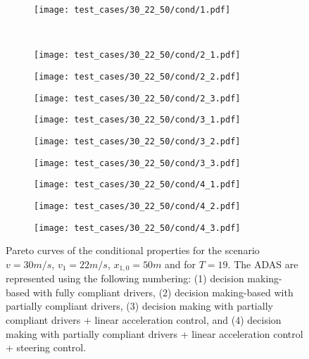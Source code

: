 \begin{figure}[H]
\vspace{3em}
\centering
\begin{subfigure}{0.32\textwidth}
  \centering
  \texttt{[image: test\_cases/30\_22\_50/cond/1.pdf]}
\end{subfigure}\\
\begin{subfigure}{0.32\textwidth}
  \centering
  \texttt{[image: test\_cases/30\_22\_50/cond/2\_1.pdf]}
\end{subfigure} 
\begin{subfigure}{0.32\textwidth}
  \centering
  \texttt{[image: test\_cases/30\_22\_50/cond/2\_2.pdf]}
\end{subfigure}
\begin{subfigure}{0.32\textwidth}
  \centering
  \texttt{[image: test\_cases/30\_22\_50/cond/2\_3.pdf]}
\end{subfigure}
\begin{subfigure}{0.32\textwidth}
  \centering
  \texttt{[image: test\_cases/30\_22\_50/cond/3\_1.pdf]}
\end{subfigure}
\begin{subfigure}{0.32\textwidth}
  \centering
  \texttt{[image: test\_cases/30\_22\_50/cond/3\_2.pdf]}
\end{subfigure}
\begin{subfigure}{0.32\textwidth}
  \centering
  \texttt{[image: test\_cases/30\_22\_50/cond/3\_3.pdf]}
\end{subfigure}
\begin{subfigure}{0.32\textwidth}
  \centering
  \texttt{[image: test\_cases/30\_22\_50/cond/4\_1.pdf]}
\end{subfigure} 
\begin{subfigure}{0.32\textwidth}
  \centering
  \texttt{[image: test\_cases/30\_22\_50/cond/4\_2.pdf]}
\end{subfigure}
\begin{subfigure}{0.32\textwidth}
  \centering
  \texttt{[image: test\_cases/30\_22\_50/cond/4\_3.pdf]}
\end{subfigure}
\caption{Pareto curves of the conditional properties for the scenario $v = 30m/s$, $v_1 = 22m/s$, $x_{1,0} = 50m$ and for $T = 19$. The ADAS are represented using the following numbering: (1) decision making-based with fully compliant drivers, (2) decision making-based with partially compliant drivers, (3) decision making with partially compliant drivers + linear acceleration control, and (4) decision making with partially compliant drivers + linear acceleration control + steering control.}
\label{fig:test_case_2_cond}
\end{figure}

